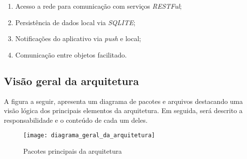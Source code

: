 \begin{enumerate}
	\item Acesso a rede para comunicação com serviços \textit{RESTFul};
	\item Persistência de dados local via \textit{SQLITE};
	\item Notificações do aplicativo via \textit{push} e local;
	\item Comunicação entre objetos facilitado.
\end{enumerate}


\subsection{Visão geral da arquitetura}
A figura a seguir, apresenta um diagrama de pacotes e arquivos destacando uma visão lógica dos principais elementos da arquitetura. Em seguida, será descrito a responsabilidade e o conteúdo de cada um deles.

\begin{figure}[H]
	\texttt{[image: diagrama\_geral\_da\_arquitetura]}
	\centering
	\caption{Pacotes principais da arquitetura}
\end{figure}

